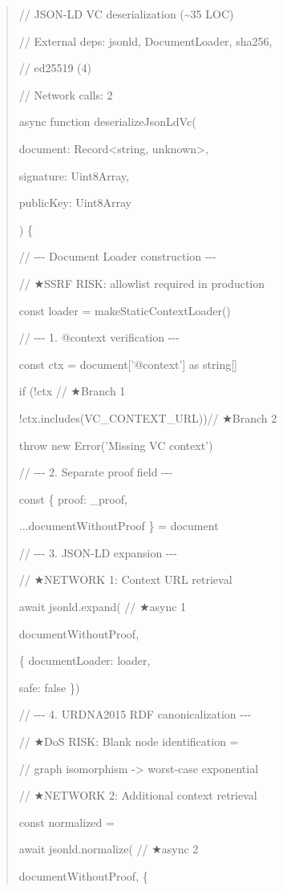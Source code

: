 \begin{quote}
// JSON-LD VC deserialization (\textasciitilde35 LOC)

// External deps: jsonld, DocumentLoader, sha256,

// ed25519 (4)

// Network calls: 2

async function deserializeJsonLdVc(

document: Record\textless string, unknown\textgreater,

signature: Uint8Array,

publicKey: Uint8Array

) \{

// -\/-\/- Document Loader construction -\/-\/-

// ★SSRF RISK: allowlist required in production

const loader = makeStaticContextLoader()

// -\/-\/- 1. @context verification -\/-\/-

const ctx = document{[}'@context'{]} as string{[}{]}

if (!ctx \textbar\textbar{} // ★Branch 1

!ctx.includes(VC\_CONTEXT\_URL))// ★Branch 2

throw new Error('Missing VC context')

// -\/-\/- 2. Separate proof field -\/-\/-

const \{ proof: \_proof,

...documentWithoutProof \} = document

// -\/-\/- 3. JSON-LD expansion -\/-\/-

// ★NETWORK 1: Context URL retrieval

await jsonld.expand( // ★async 1

documentWithoutProof,

\{ documentLoader: loader,

safe: false \})

// -\/-\/- 4. URDNA2015 RDF canonicalization -\/-\/-

// ★DoS RISK: Blank node identification =

// graph isomorphism -\textgreater{} worst-case exponential

// ★NETWORK 2: Additional context retrieval

const normalized =

await jsonld.normalize( // ★async 2

documentWithoutProof, \{


\end{quote}
